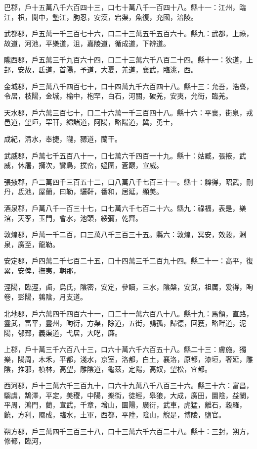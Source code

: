 \begin{pinyinscope}
巴郡，戶十五萬八千六百四十三，口七十萬八千一百四十八。縣十一：江州，臨江，枳，閬中，墊江，朐忍，安漢，宕渠，魚復，充國，涪陵。

武都郡，戶五萬一千三百七十六，口二十三萬五千五百六十。縣九：武都，上祿，故道，河池，平樂道，沮，嘉陵道，循成道，下辨道。

隴西郡，戶五萬三千九百六十四，口二十三萬六千八百二十四。縣十一：狄道，上邽，安故，氐道，首陽，予道，大夏，羌道，襄武，臨洮，西。

金城郡，戶三萬八千四百七十，口十四萬九千六百四十八。縣十三：允吾，浩亹，令居，枝陽，金城，榆中，枹罕，白石，河關，破羌，安夷，允街，臨羌。

天水郡，戶六萬三百七十，口二十六萬一千三百四十八。縣十六：平襄，街泉，戎邑道，望垣，罕幵，綿諸道，阿陽，略陽道，冀，勇士，

成紀，清水，奉捷，隴，豲道，蘭干。

武威郡，戶萬七千五百八十一，口七萬六千四百一十九。縣十：姑臧，張掖，武威，休屠，揟次，鸞鳥，撲峦，媼圍，蒼巅，宣威。

張掖郡，戶二萬四千三百五十二，口八萬八千七百三十一。縣十：觻得，昭武，刪丹，氐池，屋蘭，曰勒，驪靬，番和，居延，顯美。

酒泉郡，戶萬八千一百三十七，口七萬六千七百二十六。縣九：祿福，表是，樂涫，天孪，玉門，會水，池頭，綏彌，乾齊。

敦煌郡，戶萬一千二百，口三萬八千三百三十五。縣六：敦煌，冥安，效穀，淵泉，廣至，龍勒。

安定郡，戶四萬二千七百二十五，口十四萬三千二百九十四。縣二十一：高平，復累，安俾，撫夷，朝那，

涇陽，臨涇，鹵，烏氏，陰密，安定，參讀，三水，陰槃，安武，祖厲，爰得，眴卷，彭陽，鶉陰，月支道。

北地郡，戶六萬四千四百六十一，口二十一萬六百八十八。縣十九：馬領，直路，靈武，富平，靈州，昫衍，方渠，除道，五街，鶉孤，歸德，回獲，略畔道，泥陽，郁郅，義渠道，弋居，大呓，廉。

上郡，戶十萬三千六百八十三，口六十萬六千六百五十八。縣二十三：膚施，獨樂，陽周，木禾，平都，淺水，京室，洛都，白土，襄洛，原都，漆垣，奢延，雕陰，推邪，楨林，高望，雕陰道，龜茲，定陽，高奴，望松，宜都。

西河郡，戶十三萬六千三百九十，口六十九萬八千八百三十六。縣三十六：富昌，騶虞，鵠澤，平定，美稷，中陽，樂街，徒經，皋狼，大成，廣田，圜陰，益闌，平周，鴻門，藺，宣武，千章，增山，圜陽，廣衍，武車，虎猛，離石，穀羅，饒，方利，隰成，臨水，土軍，西都，平陸，陰山，觬是，博陵，鹽官。

朔方郡，戶三萬四千三百三十八，口十三萬六千六百二十八。縣十：三封，朔方，修都，臨河，


\end{pinyinscope}
